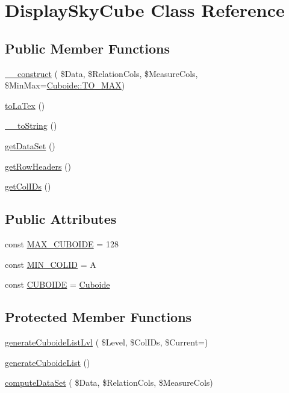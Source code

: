 \hypertarget{class_display_sky_cube}{}\section{Display\+Sky\+Cube Class Reference}
\label{class_display_sky_cube}
\subsection*{Public Member Functions}
\begin{DoxyCompactItemize}
\item 
\hyperlink{class_display_sky_cube_af33927a125f0e2b5a2eb7aea75b68b6b}{\+\_\+\+\_\+construct} ( \$Data, \$Relation\+Cols, \$Measure\+Cols, \$Min\+Max=\hyperlink{class_cuboide_afd49ea48fafb0362d27f78f6f4ef8b84}{Cuboide\+::\+T\+O\+\_\+\+M\+AX})
\item 
\hyperlink{class_display_sky_cube_a00fd4692d451b7822e09609cb55c35a5}{to\+La\+Tex} ()
\item 
\hyperlink{class_display_sky_cube_a9e27a7080cb4ac530921ce0c0ff31964}{\+\_\+\+\_\+to\+String} ()
\item 
\hyperlink{class_display_sky_cube_a2fb751d40b6b7013370bde414aa38c45}{get\+Data\+Set} ()
\item 
\hyperlink{class_display_sky_cube_ac9cbad0b516e9e4c105f8499ae00db7a}{get\+Row\+Headers} ()
\item 
\hyperlink{class_display_sky_cube_a35ef27a351a22bc855de83916e83ff4c}{get\+Col\+I\+Ds} ()
\end{DoxyCompactItemize}
\subsection*{Public Attributes}
\begin{DoxyCompactItemize}
\item 
const \hyperlink{class_display_sky_cube_abf2787de3d21e313161ba0fc36d45978}{M\+A\+X\+\_\+\+C\+U\+B\+O\+I\+DE} = 128
\item 
const \hyperlink{class_display_sky_cube_a2c4385973578fcb1349d9615d8e7eb9d}{M\+I\+N\+\_\+\+C\+O\+L\+ID} = \textquotesingle{}A\textquotesingle{}
\item 
const \hyperlink{class_display_sky_cube_a734a94c1878145102276c4d36e528363}{C\+U\+B\+O\+I\+DE} = \textquotesingle{}\hyperlink{class_cuboide}{Cuboide}\textquotesingle{}
\end{DoxyCompactItemize}
\subsection*{Protected Member Functions}
\begin{DoxyCompactItemize}
\item 
\hyperlink{class_display_sky_cube_a13fd070a47a4e316504c87a125629128}{generate\+Cuboide\+List\+Lvl} ( \$Level, \$Col\+I\+Ds, \$Current=\textquotesingle{}\textquotesingle{})
\item 
\hyperlink{class_display_sky_cube_a55b3623b8575c66eea925663fa771f7a}{generate\+Cuboide\+List} ()
\item 
\hyperlink{class_display_sky_cube_a0a64068061d9a2e499bb5cf58ebf51ce}{compute\+Data\+Set} ( \$Data, \$Relation\+Cols, \$Measure\+Cols)
\end{DoxyCompactItemize}
